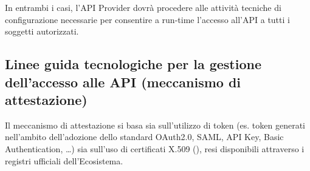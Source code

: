 \documentclass[letterpaper,10pt,italian]{sphinxmanual}
\begin{document}
In entrambi i casi, l’API Provider dovrà procedere alle attività tecniche di configurazione necessarie per consentire a run-time l’accesso all’API a tutti i soggetti autorizzati.


\subsection{Linee guida tecnologiche per la gestione dell’accesso alle API (meccanismo di attestazione)}
\label{\detokenize{sez22:sezione223}}\label{\detokenize{sez22:linee-guida-tecnologiche-per-la-gestione-dellaccesso-alle-api-meccanismo-di-attestazione}}
Il meccanismo di attestazione si basa sia sull’utilizzo di token (es. token generati nell’ambito dell’adozione dello standard OAuth2.0, SAML, API Key, Basic Authentication, …) sia sull’uso di certificati X.509 (), resi disponibili attraverso i registri ufficiali dell’Ecosistema.
\end{document}
